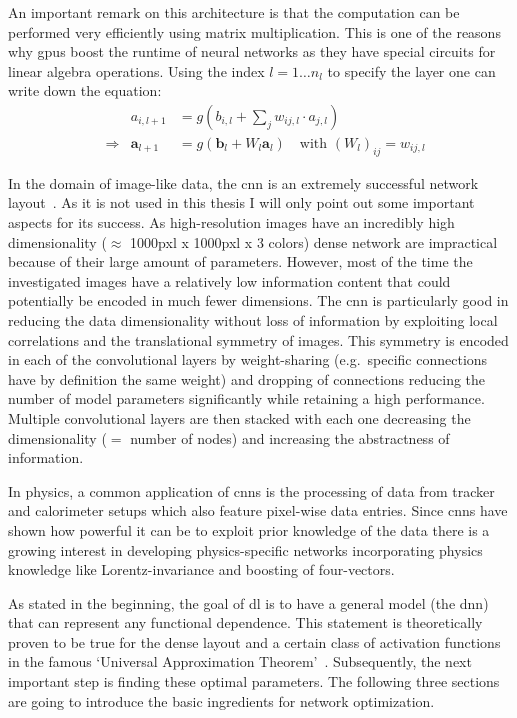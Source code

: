 An important remark on this architecture is that the computation can be performed very efficiently using matrix multiplication. This is one of the reasons why \glspl{gpu} boost the runtime of neural networks as they have special circuits for linear algebra operations. Using the index \(l=1\ldots n_l\) to specify the layer one can write down the equation:
\begin{align}
    &&a_{i, l+1} &= g\left(b_{i, l} + \sum_j w_{ij,l} \cdot a_{j, l}\right) \\
    &\Rightarrow &\bm a_{l+1} &= g \left(\bm b_l + W_l \bm a_l \right) \quad \text{with } {(W_l)}_{ij} = w_{ij, l}
\end{align}

In the domain of image-like data, the \gls{cnn} is an extremely successful network layout~\cite{cnn}. As it is not used in this thesis I will only point out some important aspects for its success. As high-resolution images have an incredibly high dimensionality (\(\approx \) 1000pxl x 1000pxl x 3 colors) dense network are impractical because of their large amount of parameters. However, most of the time the investigated images have a relatively low information content that could potentially be encoded in much fewer dimensions. The \gls{cnn} is particularly good in reducing the data dimensionality without loss of information by exploiting local correlations and the translational symmetry of images. This symmetry is encoded in each of the convolutional layers by weight-sharing (e.g.\ specific connections have by definition the same weight) and dropping of connections reducing the number of model parameters significantly while retaining a high performance. Multiple convolutional layers are then stacked with each one decreasing the dimensionality (\(=\) number of nodes) and increasing the abstractness of information.

In physics, a common application of \glspl{cnn} is the processing of data from tracker and calorimeter setups which also feature pixel-wise data entries. Since \glspl{cnn} have shown how powerful it can be to exploit prior knowledge of the data there is a growing interest in developing physics-specific networks incorporating physics knowledge like Lorentz-invariance and boosting of four-vectors.

As stated in the beginning, the goal of \gls{dl} is to have a general model (the \gls{dnn}) that can represent any functional dependence. This statement is theoretically proven to be true for the dense layout and a certain class of activation functions in the famous `Universal Approximation Theorem'~\cite{uat}. Subsequently, the next important step is finding these optimal parameters. The following three sections are going to introduce the basic ingredients for network optimization.


